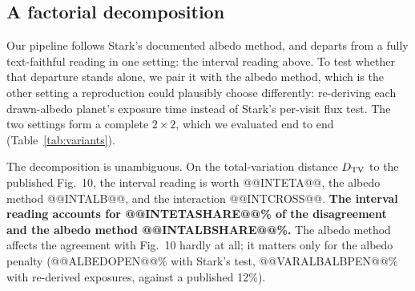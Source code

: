 \documentclass[11pt,a4paper]{article}
\begin{document}
\subsection{A factorial decomposition}

Our pipeline follows Stark's documented albedo method, and departs from a fully text-faithful
reading in one setting: the interval reading above. To test whether that departure stands alone,
we pair it with the albedo method, which is the other setting a reproduction could plausibly
choose differently: re-deriving each drawn-albedo planet's exposure time instead of Stark's
per-visit flux test. The two settings form a complete $2\times2$, which we evaluated end to end
(Table~\ref{tab:variants}).

The decomposition is unambiguous. On the total-variation distance $D_{\rm TV}$ to the published
Fig.~10, the
interval reading is worth @@INTETA@@, the albedo method @@INTALB@@, and the interaction
@@INTCROSS@@. \textbf{The interval reading accounts for @@INTETASHARE@@\% of the disagreement and
the albedo method @@INTALBSHARE@@\%.} The albedo method affects the agreement with Fig.~10 hardly
at all; it matters only for the albedo penalty (@@ALBEDOPEN@@\% with Stark's test,
@@VARALBALBPEN@@\% with re-derived exposures, against a published 12\%).
\end{document}
